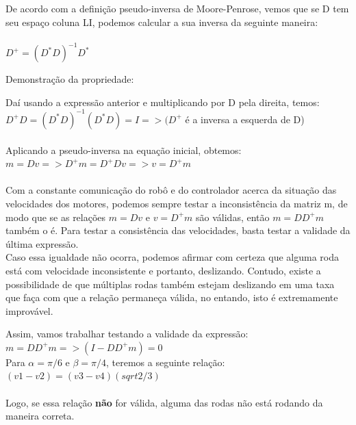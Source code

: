 \documentclass{article}
\begin{document}
De acordo com a definição pseudo-inversa de Moore-Penrose, vemos que se D tem seu espaço coluna LI, podemos calcular a sua inversa da seguinte maneira:
\\ \\ $D^+ = (D^*D)^{-1} D^*$

Demonstração da propriedade:

Daí usando a expressão anterior e multiplicando por D pela direita, temos:
\\ $D^+D = (D^*D)^{-1}(D^*D) = I => (D^+$ é a inversa a esquerda de D)  
\\ \\ Aplicando a pseudo-inversa na equação inicial, obtemos:
$ m = Dv => D^+m = D^+Dv => v = D^+m$
\\ \\ Com a constante comunicação do robô e do controlador acerca da situação das velocidades dos motores, podemos sempre testar a inconsistência da matriz m, de modo que
se as relações $m = Dv$ e $v = D^+m$ são válidas, então $m = DD^+m$ também o é. Para testar a consistência das velocidades, basta testar a validade da última expressão.
\\ Caso essa igualdade não ocorra, podemos afirmar com certeza que alguma roda está com velocidade inconsistente e portanto, deslizando. Contudo, existe a possibilidade de que múltiplas rodas também estejam deslizando em uma taxa que faça com que a relação permaneça válida,
no entando, isto é extremamente improvável.

Assim, vamos trabalhar testando a validade da expressão:
\\ $ m = DD^+m => (I - DD^+m) = 0$
\\ Para $\alpha = \pi/6$ e $\beta = \pi/4$, teremos a seguinte relação:
\\ $(v1 - v2) = (v3 - v4)(sqrt{2/3})$
\\ \\ Logo, se essa relação \textbf{não} for válida, alguma das rodas não está rodando da maneira correta.
\end{document}
